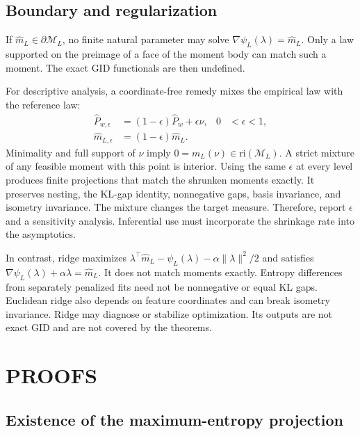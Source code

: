 \documentclass[twoside]{article}
\theoremstyle{definition}
\theoremstyle{remark}
\newcommand{\M}{\mathcal M}
\newcommand{\ri}{\mathrm{ri}}
\begin{document}
\subsection{Boundary and regularization}

If $\widehat m_L\in\partial\M_L$, no finite natural parameter may solve $\nabla\psi_L(\lambda)=\widehat m_L$. Only a law supported on the preimage of a face of the moment body can match such a moment. The exact GID functionals are then undefined.

For descriptive analysis, a coordinate-free remedy mixes the empirical law with the reference law:
\[
\begin{aligned}
 \widehat P_{w,\epsilon}&=(1-\epsilon)\widehat P_w+\epsilon\nu,
 &0&<\epsilon<1,\\
 \widehat m_{L,\epsilon}&=(1-\epsilon)\widehat m_L.
\end{aligned}
\]
Minimality and full support of $\nu$ imply $0=m_L(\nu)\in\ri(\M_L)$. A strict mixture of any feasible moment with this point is interior. Using the same $\epsilon$ at every level produces finite projections that match the shrunken moments exactly. It preserves nesting, the KL-gap identity, nonnegative gaps, basis invariance, and isometry invariance. The mixture changes the target measure. Therefore, report $\epsilon$ and a sensitivity analysis. Inferential use must incorporate the shrinkage rate into the asymptotics.

In contrast, ridge maximizes $\lambda^\top\widehat m_L-\psi_L(\lambda)-\alpha\|\lambda\|^2/2$ and satisfies $\nabla\psi_L(\lambda)+\alpha\lambda=\widehat m_L$. It does not match moments exactly. Entropy differences from separately penalized fits need not be nonnegative or equal KL gaps. Euclidean ridge also depends on feature coordinates and can break isometry invariance. Ridge may diagnose or stabilize optimization. Its outputs are not exact GID and are not covered by the theorems.





\section{PROOFS}\label{app:proofs}

\subsection{Existence of the maximum-entropy projection}
\end{document}
